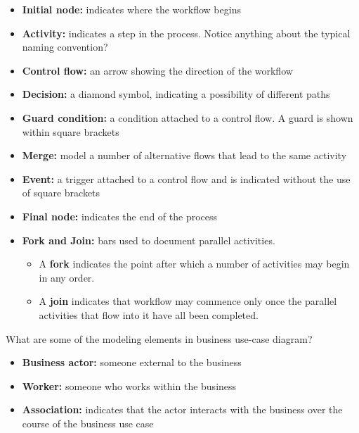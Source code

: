 \documentclass[10pt,a4paper]{exam}
\begin{document}
\begin{questions}
\begin{solution}
\begin{itemize}
        \item \textbf{Initial node:}  indicates where the workflow begins
        \item \textbf{Activity:} indicates a step in the process. Notice anything about the typical naming convention?
        \item \textbf{Control flow:} an arrow showing the direction of the workflow
        \item \textbf{Decision:} a diamond symbol, indicating a possibility of different paths
        \item \textbf{Guard condition:} a condition attached to a control flow. A guard is shown within square brackets
        \item \textbf{Merge:} model a number of alternative flows that lead to the same activity
        \item \textbf{Event:} a trigger attached to a control flow and is indicated without the use of square brackets
        \item \textbf{Final node:} indicates the end of the process
        \item \textbf{Fork and Join:} bars used to document parallel activities.
        \begin{itemize}
                \item A \textbf{fork} indicates the point after which a number of activities may begin in any order. 
                \item A \textbf{join} indicates that workflow may commence only once the parallel activities that flow into it have all been completed.
        \end{itemize}

\end{itemize}
\end{solution}


\question What are some of the modeling elements in business use-case diagram?
\begin{solution}
\begin{itemize}

        \item \textbf{Business actor:} someone external to the business
        \item \textbf{Worker:} someone who works within the business
        \item \textbf{Association:} indicates that the actor interacts with the business over the course of the business use case


\end{itemize}
\end{solution}
\end{questions}
\end{document}
